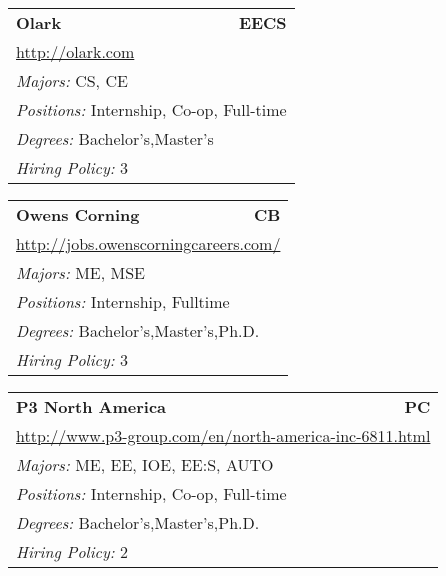\documentclass[twoside]{article}
\begin{document}
\begin{center}
\begin{multicols}{3}
\begin{FlushLeft}
\begin{minipage}{.9\columnwidth}
\end{minipage}
 
\begin{minipage}{.9\columnwidth}\begin{tabularx}{.95\columnwidth}{Xr}
                 {\Large\bf Olark} & {\Large\bf EECS}\\
    \multicolumn{2}{p{.95\columnwidth}}{\url{http://olark.com}}\\
    \multicolumn{2}{p{.95\columnwidth}}{\emph{Majors:} CS, CE}\\
    \multicolumn{2}{p{.95\columnwidth}}{\emph{Positions:} Internship, Co-op, Full-time}\\
    \multicolumn{2}{p{.95\columnwidth}}{\emph{Degrees:} Bachelor's,Master's}\\
    \multicolumn{2}{p{.95\columnwidth}}{\emph{Hiring Policy:} 3}\\
    \end{tabularx}
    
\end{minipage}
 
\begin{minipage}{.9\columnwidth}\begin{tabularx}{.95\columnwidth}{Xr}
                 {\Large\bf Owens Corning} & {\Large\bf CB}\\
    \multicolumn{2}{p{.95\columnwidth}}{\url{http://jobs.owenscorningcareers.com/}}\\
    \multicolumn{2}{p{.95\columnwidth}}{\emph{Majors:} ME, MSE}\\
    \multicolumn{2}{p{.95\columnwidth}}{\emph{Positions:} Internship,  Fulltime}\\
    \multicolumn{2}{p{.95\columnwidth}}{\emph{Degrees:} Bachelor's,Master's,Ph.D.}\\
    \multicolumn{2}{p{.95\columnwidth}}{\emph{Hiring Policy:} 3}\\
    \end{tabularx}
    
\end{minipage}
 
\begin{minipage}{.9\columnwidth}\begin{tabularx}{.95\columnwidth}{Xr}
                 {\Large\bf P3 North America} & {\Large\bf PC}\\
    \multicolumn{2}{p{.95\columnwidth}}{\url{http://www.p3-group.com/en/north-america-inc-6811.html}}\\
    \multicolumn{2}{p{.95\columnwidth}}{\emph{Majors:} ME, EE, IOE, EE:S, AUTO}\\
    \multicolumn{2}{p{.95\columnwidth}}{\emph{Positions:} Internship, Co-op, Full-time}\\
    \multicolumn{2}{p{.95\columnwidth}}{\emph{Degrees:} Bachelor's,Master's,Ph.D.}\\
    \multicolumn{2}{p{.95\columnwidth}}{\emph{Hiring Policy:} 2}\\
    \end{tabularx}
    

\end{minipage}
\end{FlushLeft}
\end{multicols}
\end{center}
\end{document}
